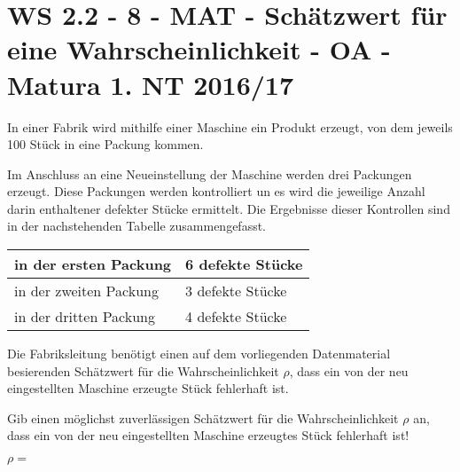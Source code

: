 \section{WS 2.2 - 8 - MAT - Schätzwert für eine Wahrscheinlichkeit - OA - Matura 1. NT 2016/17}

\begin{beispiel}[WS 2.2]{1} %
In einer Fabrik wird mithilfe einer Maschine ein Produkt erzeugt, von dem jeweils 100 Stück in eine Packung kommen.

Im Anschluss an eine Neueinstellung der Maschine werden drei Packungen erzeugt. Diese Packungen werden kontrolliert un es wird die jeweilige Anzahl darin enthaltener defekter Stücke ermittelt. Die Ergebnisse dieser Kontrollen sind in der nachstehenden Tabelle zusammengefasst.

\begin{center}
	\begin{tabular}{|l|l|}\hline
	\cellcolor[gray]{0.9}in der ersten Packung&6 defekte Stücke\\ \hline
	\cellcolor[gray]{0.9}in der zweiten Packung&3 defekte Stücke\\ \hline
	\cellcolor[gray]{0.9}in der dritten Packung&4 defekte Stücke\\ \hline	
	\end{tabular}
\end{center}

Die Fabriksleitung benötigt einen auf dem vorliegenden Datenmaterial besierenden Schätzwert für die Wahrscheinlichkeit $\rho$, dass ein von der neu eingestellten Maschine erzeugte Stück fehlerhaft ist.

Gib einen möglichst zuverlässigen Schätzwert für die Wahrscheinlichkeit $\rho$ an, dass ein von der neu eingestellten Maschine erzeugtes Stück fehlerhaft ist!

$\rho=$ 

\end{beispiel}